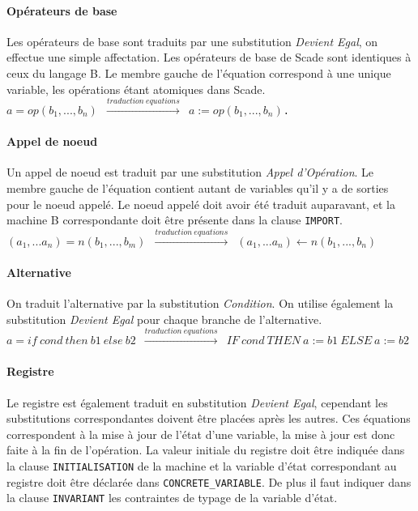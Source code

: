 \paragraph{Opérateurs de base}
Les opérateurs de base sont traduits par une substitution \emph{Devient Egal}, on
effectue une simple affectation. Les opérateurs de base de Scade sont identiques
à ceux du langage B. Le membre gauche de l'équation correspond à une unique
variable, les opérations étant atomiques dans Scade. \\

\texttt{$a = op(b_1,...,b_n)$ $\xrightarrow{traduction ~ equations}$ $a:=op(b_1,...,b_n)$. }

\paragraph{Appel de noeud}
Un appel de noeud est traduit par une substitution \emph{Appel d'Opération}. Le
membre gauche de l'équation contient autant de variables qu'il y a de sorties
pour le noeud appelé. Le noeud appelé doit avoir été traduit auparavant, et la
machine B correspondante doit être présente dans la clause \texttt{IMPORT}.\\

\texttt{$(a_1, ... a_n) = n(b_1, ..., b_m)$ $\xrightarrow{traduction ~ equations}$ $(a_1, ... a_n) \leftarrow n(b_1,
..., b_n)$}

\paragraph{Alternative}
On traduit l'alternative par la substitution \emph{Condition}. On utilise
également la substitution \emph{Devient Egal} pour chaque branche de l'alternative.\\

\texttt{$ a = if~ cond~ then~ b1~ else~ b2$ $\xrightarrow{traduction ~ equations}$ $IF ~cond~ THEN ~a:=b1~ ELSE
~a:=b2$}

\paragraph{Registre}
Le registre est également traduit en substitution \emph{Devient Egal}, cependant
les substitutions correspondantes doivent être placées après les autres. Ces
équations correspondent à la mise à jour de l'état d'une variable, la mise à
jour est donc faite à la fin de l'opération. La valeur initiale du registre doit
être indiquée dans la clause \texttt{INITIALISATION} de la machine et la variable d'état
correspondant au registre doit être déclarée dans \texttt{CONCRETE\_VARIABLE}. De
plus il faut indiquer dans la clause \texttt{INVARIANT} les contraintes de typage
de la variable d'état. \\


